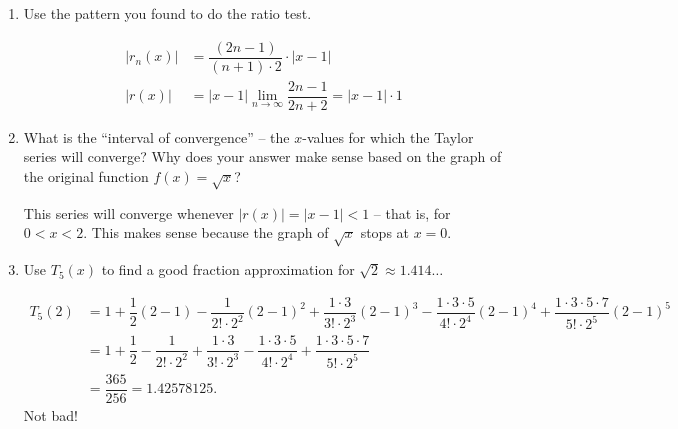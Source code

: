 \begin{enumerate}[leftmargin=0pt]
\begin{enumerate}
    \begin{red}
        $c_k = (-1)^{k+1}\dfrac{1\cdot 3 \cdot \ldots \cdot (2k-3)}{k!\cdot 2^k}.$
    \end{red}
    \item Use the pattern you found to do the ratio test.
    \begin{red}
    \begin{align*}
        |r_n(x)|
        &= \dfrac{(2n-1)}{(n+1)\cdot 2}\cdot |x-1| \\
        |r(x)| &= |x-1| \lim_{n\to \infty} \dfrac{2n-1}{2n+2} = |x-1|\cdot 1
    \end{align*}
    \end{red}
    
    \item What is the ``interval of convergence'' -- the $x$-values for which the Taylor series will converge? Why does your answer make sense based on the graph of the original function $f(x) = \sqrt{x}$?

    \begin{red}
        This series will converge whenever $|r(x)| = |x-1| < 1$ -- that is, for $0 < x < 2$. This makes sense because the graph of $\sqrt{x}$ stops at $x=0$.
    \end{red}
    \item Use $T_5(x)$ to find a good fraction approximation for $\sqrt{2} \approx 1.414\ldots$

    \begin{red}
        \begin{align*}
            T_5(2) &= 1 
        + \dfrac12 (2-1) 
        - \dfrac{1}{2!\cdot 2^2}(2-1)^2
        + \dfrac{1\cdot 3}{3!\cdot 2^3}(2-1)^3 
        - \dfrac{1\cdot3 \cdot 5}{4!\cdot 2^4}(2-1)^4
        + \dfrac{1\cdot3 \cdot 5\cdot 7}{5!\cdot 2^5}(2-1)^5 \\
        &= 1 
        + \dfrac12 
        - \dfrac{1}{2!\cdot 2^2}
        + \dfrac{1\cdot 3}{3!\cdot 2^3}
        - \dfrac{1\cdot3 \cdot 5}{4!\cdot 2^4}
        + \dfrac{1\cdot3 \cdot 5\cdot 7}{5!\cdot 2^5} \\
        &= \dfrac{365}{256} = 1.42578125.
        \end{align*}
        Not bad!
    \end{red}
\end{enumerate}

    

\end{enumerate}
